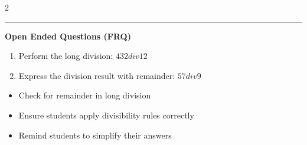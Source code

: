 \documentclass[10pt]{article}
\begin{document}
\begin{multicols}{2}
\begin{enumerate}[label=\textbf{Q\arabic*.}, leftmargin=*, itemsep=6pt, parsep=0pt]
\end{enumerate}
\end{multicols}

\vspace{-0.2cm}
\hrule
\vspace{0.2cm}
\textbf{\small Open Ended Questions (FRQ)}
\begin{enumerate}[label=\textbf{Q\arabic*.}, start=9, itemsep=5pt, topsep=0pt]

  \item \small Perform the long division: $432 div 12$ \vspace{2cm}

  \item \small Express the division result with remainder: $57 div 9$ \vspace{2cm}

\end{enumerate}

\vfill

\begin{tcolorbox}[colback=blue!5, colframe=mainblue!50, title=\small \textbf{Chef's Tips}, fonttitle=\bfseries, bottom=1mm]
\begin{itemize}[noitemsep, topsep=2pt, leftmargin=0.5cm]
  \item \scriptsize Check for remainder in long division\item \scriptsize Ensure students apply divisibility rules correctly\item \scriptsize Remind students to simplify their answers
\end{itemize}
\end{tcolorbox}
\end{document}
